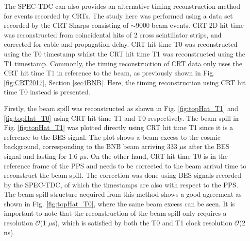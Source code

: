 The SPEC-TDC can also provides an alternative timing reconstruction method for events recorded by CRTs.
The study here was performed using a data set recorded by the CRT Sharps consisting of $\sim$9000 beam events. 
CRT 2D hit time was reconstructed from coincidental hits of 2 cross scintillator strips, and corrected for cable and propagation delay.
CRT hit time T0 was reconstructed using the T0 timestamp whilst the CRT hit time T1 was reconstructed using the T1 timestamp. 
Commonly, the timing reconstruction of CRT data only uses the CRT hit time T1 in reference to the beam, as previously shown in Fig. \ref{fig:CRT2017}, Section \ref{sec4BNB}.
Here, the timing reconstruction using CRT hit time T0 instead is presented.

Firstly, the beam spill was reconstructed as shown in Fig. \ref{fig:topHat_T1} and \ref{fig:topHat_T0} using CRT hit time T1 and T0 respectively.
The beam spill in Fig. \ref{fig:topHat_T1} was plotted directly using CRT hit time T1 since it is a reference to the BES signal.
The plot shows a beam excess to the cosmic background, corresponding to the BNB beam arriving 333 $\mu$s after the BES signal and lasting for 1.6 $\mu$s.
On the other hand, CRT hit time T0 is in the reference frame of the PPS and needs to be corrected to the beam arrival time to reconstruct the beam spill.
The correction was done using BES signals recorded by the SPEC-TDC, of which the timestamps are also with respect to the PPS. %
The beam spill structure acquired from this method shows a good agreement as shown in Fig. \ref{fig:topHat_T0}, where the same beam excess can be seen.
It is important to note that the reconstruction of the beam spill only requires a resolution $\mathcal{O}$(1 $\mu$s), which is satisfied by both the T0 and T1 clock resolution $\mathcal{O}$(2 ns).

